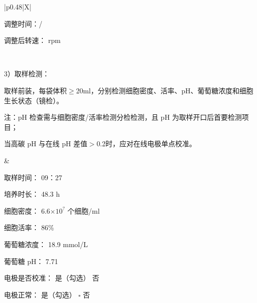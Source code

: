 \documentclass[UTF8,10pt,a4paper,fontset=fandol]{ctexart}
\newcommand{\fieldvalue}[1]{#1}
\newcommand{\handwritten}[1]{#1}
\begin{document}
\begin{tabularx}{\textwidth}{|p{0.48\textwidth}|X|}
\begin{minipage}[t]{\linewidth}
\vspace{2pt}
调整时间：\underline{\hspace{3em}}/\underline{\hspace{3em}}

\vspace{2pt}
调整后转速：\underline{\hspace{3em}} rpm
\end{minipage}
\\
\hline
\begin{minipage}[t]{\linewidth}
3）取样检测：

取样前装，每袋体积$\geq$20ml，分别检测细胞密度、活率、pH、葡萄糖浓度和细胞生长状态（镜检）。

注：pH 检查需与细胞密度/活率检测分检检测，且 pH 为取样开口后首要检测项目；

当高碳 pH 与在线 pH 差值$>$0.2时，应对在线电极单点校准。
\end{minipage}
&
\begin{minipage}[t]{\linewidth}
取样时间：
\fieldvalue{\handwritten{09：27}}

\vspace{2pt}
培养时长：
\fieldvalue{\handwritten{48.3}} h

\vspace{2pt}
细胞密度：
\fieldvalue{\handwritten{6.6$\times10^{?}$}} 个细胞/ml

\vspace{2pt}
细胞活率：
\fieldvalue{\handwritten{86\%}}

\vspace{2pt}
葡萄糖浓度：
\fieldvalue{\handwritten{18.9}} mmol/L

\vspace{2pt}
葡萄糖 pH：
\fieldvalue{\handwritten{7.71}}

\vspace{2pt}
电极是否校准：
\fieldvalue{\handwritten{是（勾选）}} \quad 否

\vspace{2pt}
电极正常：
\fieldvalue{\handwritten{是（勾选）}} \quad $\square$ 否
\end{minipage}
\\
\hline
\multicolumn{2}{|l|}{
备注：
\fieldvalue{\handwritten{/}}
} \\
\hline
\end{tabularx}
\end{document}
